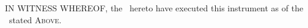 IN WITNESS WHEREOF, the \parties\ hereto have executed this instrument as of the \effectiveDate\ stated \textsc{Above}.
\newline

\signaturesection
